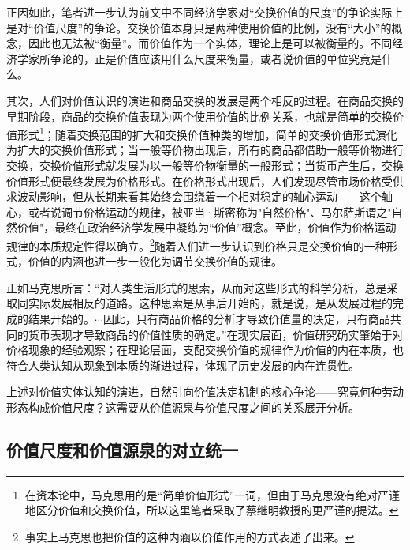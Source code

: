 正因如此，笔者进一步认为前文中不同经济学家对“交换价值的尺度”的争论实际上是对“价值尺度”的争论。交换价值本身只是两种使用价值的比例，没有“大小”的概念，因此也无法被“衡量”。而价值作为一个实体，理论上是可以被衡量的。不同经济学家所争论的，正是价值应该用什么尺度来衡量，或者说价值的单位究竟是什么。

其次，人们对价值认识的演进和商品交换的发展是两个相反的过程。在商品交换的早期阶段，商品的交换价值表现为两个使用价值的比例关系\cite[49]{ZhongGongZhongYangMaKeSiEnGeSiLieNingSiDaLinZhuZuoBianYiJuMaKeSiEnGeSiWenJiDi5Juan2009}，也就是简单的交换价值形式\footnote{在资本论中，马克思用的是“简单价值形式”一词，但由于马克思没有绝对严谨地区分价值和交换价值\cite[37]{ZhongGongZhongYangMaKeSiEnGeSiLieNingSiDaLinZhuZuoBianYiJuMaKeSiEnGeSiWenJiDi8Juan2009}，所以这里笔者采取了蔡继明教授的更严谨的提法\cite[145]{CaiJiMingJieZhiZhengLunHuiGuYuZhanWang2008}。}；随着交换范围的扩大和交换价值种类的增加，简单的交换价值形式演化为扩大的交换价值形式；当一般等价物出现后，所有的商品都借助一般等价物进行交换，交换价值形式就发展为以一般等价物衡量的一般形式；当货币产生后，交换价值形式便最终发展为价格形式。在价格形式出现后，人们发现尽管市场价格受供求波动影响，但从长期来看其始终会围绕着一个相对稳定的轴心运动——这个轴心，或者说调节价格运动的规律，被亚当·斯密称为"自然价格"、马尔萨斯谓之"自然价值"，最终在政治经济学发展中凝练为“价值”概念。至此，价值作为价格运动规律的本质规定性得以确立。\cite[145]{CaiJiMingJieZhiZhengLunHuiGuYuZhanWang2008}\footnote{事实上马克思也把价值的这种内涵以价值作用的方式表述了出来\cite[199]{ZhongGongZhongYangMaKeSiEnGeSiLieNingSiDaLinZhuZuoBianYiJuMaKeSiEnGeSiWenJiDi7Juan2009}。}随着人们进一步认识到价格只是交换价值的一种形式，价值的内涵也进一步一般化为调节交换价值的规律。

正如马克思所言：“对人类生活形式的思索，从而对这些形式的科学分析，总是采取同实际发展相反的道路。这种思索是从事后开始的，就是说，是从发展过程的完成的结果开始的。$\cdots$因此，只有商品价格的分析才导致价值量的决定，只有商品共同的货币表现才导致商品的价值性质的确定。”\cite[93]{ZhongGongZhongYangMaKeSiEnGeSiLieNingSiDaLinZhuZuoBianYiJuMaKeSiEnGeSiWenJiDi5Juan2009}在现实层面，价值研究确实肇始于对价格现象的经验观察；在理论层面，支配交换价值的规律作为价值的内在本质，也符合人类认知从现象到本质的渐进过程，体现了历史发展的内在连贯性。

上述对价值实体认知的演进，自然引向价值决定机制的核心争论——究竟何种劳动形态构成价值尺度？这需要从价值源泉与价值尺度之间的关系展开分析。

\subsection{价值尺度和价值源泉的对立统一}

